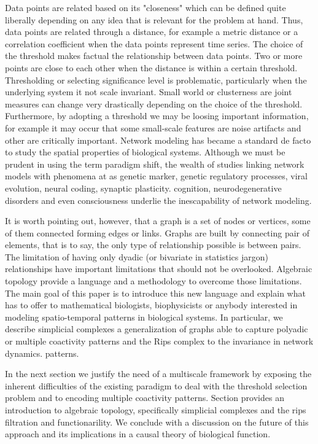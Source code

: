 \documentclass[onecollarge,runningheads]{svjour2}
\begin{document}
Data points are related based on its "closeness" which can be defined quite liberally depending on any idea that is relevant for the problem at hand. Thus, data points are related through a distance, for example a metric distance or a correlation coefficient when the data points represent time series. The choice of the threshold makes factual the relationship between data points. Two or more points are close to each other when the distance is within a certain threshold. 
Thresholding or selecting significance level is problematic, particularly when the underlying system it not scale invariant. Small world or clusterness are joint measures can change very drastically depending on the choice of the threshold. Furthermore, by adopting a threshold  we may be loosing important information, for example it may occur that some small-scale features are noise artifacts and other are critically important.   
Network modeling has became a standard de facto to study the spatial properties of biological systems. 
Although we must be prudent in using the term paradigm shift, the wealth of studies linking network models  with phenomena at  as genetic marker, genetic regulatory processes, viral evolution, neural coding, synaptic plasticity. cognition, neurodegenerative disorders and even consciousness underlie the inescapability of network modeling.  

It is worth pointing out, however, that a graph is a set of nodes or vertices, some of them connected forming edges or links. Graphs are built by connecting pair of elements, that is to say, the only type of relationship possible is between pairs. The limitation of having only dyadic (or bivariate in statistics jargon) relationships have important limitations that should not be overlooked.
Algebraic topology provide a language and a methodology to overcome those limitations.
The main goal of this paper is to introduce this new language and explain what has to offer to mathematical biologists, biophysicists or anybody interested in modeling spatio-temporal patterns in biological systems.
In particular, we describe simplicial complexes a generalization of graphs able to capture polyadic or multiple coactivity patterns and the Rips complex to the invariance in network dynamics.
patterns.

In the next section we justify the need of a multiscale framework by exposing the inherent difficulties of the existing paradigm to deal with the threshold selection problem and to encoding multiple coactivity patterns.
Section provides an introduction to algebraic topology, specifically simplicial complexes and the rips filtration and  functionarility.
We conclude with a discussion on the future of this approach and its implications in a causal theory of biological function.
\end{document}
